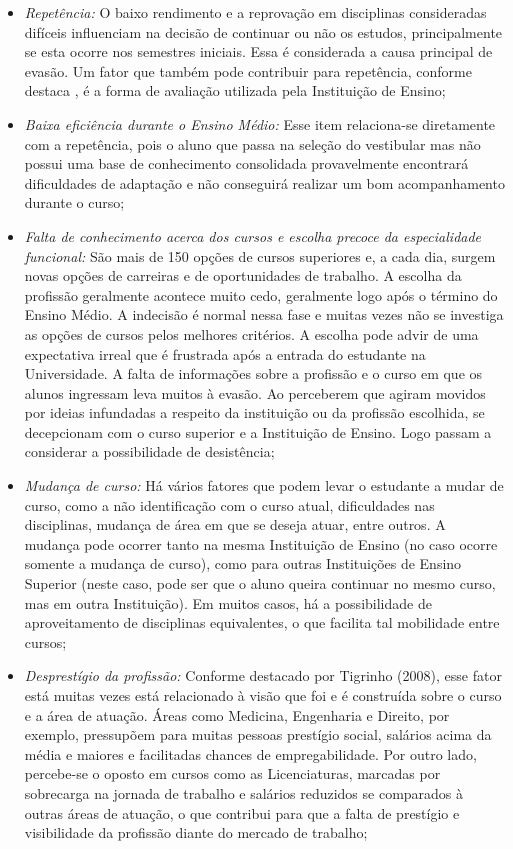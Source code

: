 \begin{itemize} 
\item \textit{Repetência:} O baixo rendimento e a reprovação em disciplinas consideradas difíceis influenciam na decisão de continuar ou não os estudos, principalmente se esta ocorre nos semestres iniciais. Essa é considerada a causa principal de evasão. Um fator que também pode contribuir para repetência, conforme destaca \citet{tigrinho2008}, é a forma de avaliação utilizada pela Instituição de Ensino;

\item\textit{ Baixa eficiência durante o Ensino Médio:} Esse item relaciona-se diretamente com a repetência, pois o aluno que passa na seleção do vestibular mas não possui uma base de conhecimento consolidada provavelmente encontrará dificuldades de adaptação e não conseguirá realizar um bom acompanhamento durante o curso;

\item \textit{Falta de conhecimento acerca dos cursos e escolha precoce da especialidade funcional:} São mais de 150 opções de cursos superiores e, a cada dia, surgem novas opções de carreiras e de oportunidades de trabalho. A escolha da profissão geralmente acontece muito cedo, geralmente logo após o término do Ensino Médio. A indecisão é normal nessa fase e muitas vezes não se investiga as opções de cursos pelos melhores critérios. A escolha pode advir de uma expectativa irreal que é frustrada após a entrada do estudante na Universidade. A falta de informações sobre a profissão e o curso em que os alunos ingressam leva muitos à evasão. Ao perceberem que agiram movidos por ideias infundadas a respeito da instituição ou da profissão escolhida, se decepcionam com o curso superior e a Instituição de Ensino. Logo passam a considerar a possibilidade de desistência;

\item \textit{Mudança de curso:} Há vários fatores que podem levar o estudante a mudar de curso, como a não identificação com o curso atual, dificuldades nas disciplinas, mudança de área em que se deseja atuar, entre outros. A mudança pode ocorrer tanto na mesma Instituição de Ensino (no caso ocorre somente a mudança de curso), como para outras Instituições de Ensino Superior (neste caso, pode ser que o aluno queira continuar no mesmo curso, mas em outra Instituição). Em muitos casos, há a possibilidade de aproveitamento de disciplinas equivalentes, o que facilita tal mobilidade entre cursos;

\item \textit{Desprestígio da profissão:} Conforme destacado por Tigrinho (2008), esse fator está muitas vezes está relacionado à visão que foi e é construída sobre o curso e a área de atuação. Áreas como Medicina, Engenharia e Direito, por exemplo, pressupõem para muitas pessoas prestígio social, salários acima da média e maiores e facilitadas chances de empregabilidade. Por outro lado, percebe-se o oposto em cursos como as Licenciaturas, marcadas por sobrecarga na jornada de trabalho e salários reduzidos se comparados à outras áreas de atuação, o que contribui para que a falta de prestígio e visibilidade da profissão diante do mercado de trabalho;


\end{itemize}
